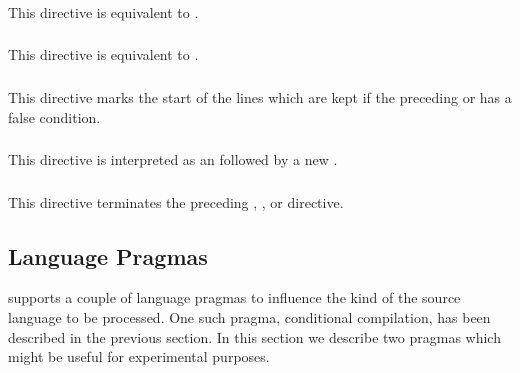 \subsubsection*{}

This directive is equivalent to .

\subsubsection*{}

This directive is equivalent to .

\subsubsection*{}

This directive marks the start of the lines which are kept
if the preceding  or  has a false condition.

\subsubsection*{}

This directive is interpreted as an  followed by
a new .

\subsubsection*{}

This directive terminates the preceding
, , or  directive.


\subsection{Language Pragmas}

\CYS supports a couple of language pragmas
to influence the kind of the source language to be processed.
One such pragma, conditional compilation, has been described
in the previous section.
In this section we describe two pragmas which might be useful
for experimental purposes.

